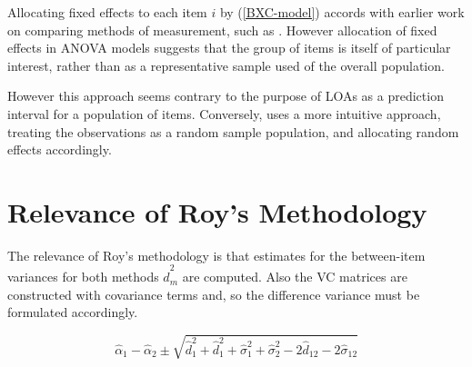 \documentclass[12pt, a4paper]{report}
\theoremstyle{plain}
\theoremstyle{definition}
\theoremstyle{remark}
\begin{document}
Allocating fixed effects to each item $i$ by (\ref{BXC-model}) accords with earlier work on comparing methods of measurement, such as \citet{Grubbs48}. However allocation of fixed effects in ANOVA models suggests that the group of items is itself of particular interest, rather than as a representative sample used of the overall population. 

However this approach seems contrary to the purpose of LOAs as a prediction interval for a population of items. Conversely, \citet{ARoy2009}
uses a more intuitive approach, treating the observations as a random sample population, and allocating random effects accordingly.









	


	\section{Relevance of Roy's Methodology}

The relevance of Roy's methodology is that estimates for the between-item variances for both methods $\hat{d}^2_m$ are computed. Also the VC matrices are constructed with covariance
terms and, so the difference variance must be formulated accordingly.


\[
\hat{\alpha}_1 - \hat{\alpha}_2 \pm \sqrt{ \hat{d}^2_1  +
	\hat{d}^2_1 + \hat{\sigma}^2_1 + \hat{\sigma}^2_2 - 2 \hat{d}_{12}
	- 2 \hat{\sigma}_12}
\]



%
%


%
%
\end{document}
